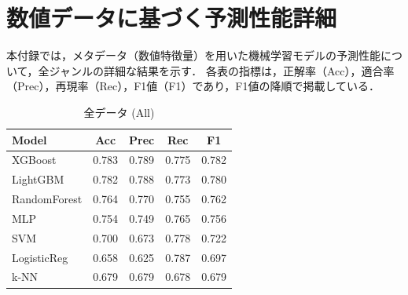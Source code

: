 \documentclass[uplatex, dvipdfmx, 11pt, a4paper, report]{jsbook}
\begin{document}


\chapter{数値データに基づく予測性能詳細}
\label{app:numeric_detail}

本付録では，メタデータ（数値特徴量）を用いた機械学習モデルの予測性能について，全ジャンルの詳細な結果を示す．
各表の指標は，正解率（Acc），適合率（Prec），再現率（Rec），F1値（F1）であり，F1値の降順で掲載している．

\setlength{\tabcolsep}{3pt} 

\begin{table}[H]
  \centering
  \small
  \caption{全データ (All)}
  \label{tab:res_all}
  \begin{tabular}{l|c|c|c|c} \hline
    Model & Acc & Prec & Rec & F1 \\ \hline
    XGBoost & 0.783 & 0.789 & 0.775 & 0.782 \\
    LightGBM & 0.782 & 0.788 & 0.773 & 0.780 \\
    RandomForest & 0.764 & 0.770 & 0.755 & 0.762 \\
    MLP & 0.754 & 0.749 & 0.765 & 0.756 \\
    SVM & 0.700 & 0.673 & 0.778 & 0.722 \\
    LogisticReg & 0.658 & 0.625 & 0.787 & 0.697 \\
    k-NN & 0.679 & 0.679 & 0.678 & 0.679 \\ \hline
  \end{tabular}
\end{table}
\end{document}
